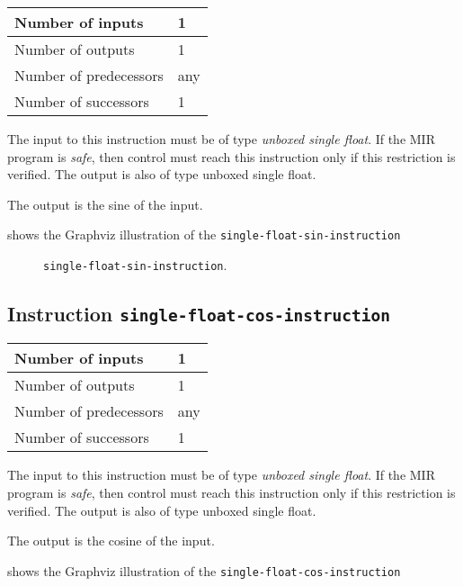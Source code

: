 \begin{tabular}{|l|l|}
\hline
Number of inputs & 1\\
\hline
Number of outputs & 1\\
\hline
Number of predecessors & any\\
\hline
Number of successors & 1\\
\hline
\end{tabular}

The input to this instruction must be of type \emph{unboxed single
  float}.  If the MIR program is \emph{safe}, then control must reach
this instruction only if this restriction is verified.  The output is
also of type unboxed single float.

The output is the sine of the input.

 shows the Graphviz illustration of the
\texttt{single-float-sin-instruction}

\begin{figure}
\begin{center}
\end{center}
\caption{\label{fig-single-float-sin-instruction}
\texttt{single-float-sin-instruction}.}
\end{figure}

\subsection{Instruction \texttt{single-float-cos-instruction}}
\label{mir-instruction-single-float-div}

\begin{tabular}{|l|l|}
\hline
Number of inputs & 1\\
\hline
Number of outputs & 1\\
\hline
Number of predecessors & any\\
\hline
Number of successors & 1\\
\hline
\end{tabular}

The input to this instruction must be of type \emph{unboxed single
  float}.  If the MIR program is \emph{safe}, then control must reach
this instruction only if this restriction is verified.  The output is
also of type unboxed single float.

The output is the cosine of the input.

 shows the Graphviz illustration of the
\texttt{single-float-cos-instruction}

